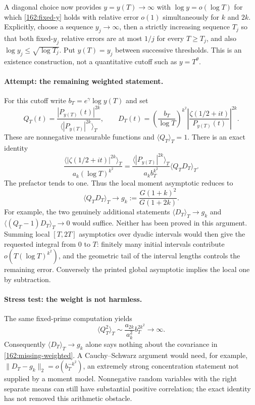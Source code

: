 \documentclass[11pt,a4paper]{article}
\numberwithin{equation}{section}
\begin{document}
A diagonal choice now provides $y=y(T)\to\infty$ with
$\log y=o(\log T)$ for which
\eqref{162:fixed-y} holds with relative error $o(1)$ simultaneously for
$k$ and $2k$. Explicitly, choose a sequence $y_j\to\infty$, then a
strictly increasing sequence $T_j$ so that both fixed-$y_j$ relative
errors are at most $1/j$ for every $T\ge T_j$, and also
$\log y_j\le\sqrt{\log T_j}$. Put $y(T)=y_j$ between successive thresholds.
This is an existence construction, not a quantitative cutoff such as
$y=T^\theta$.

\paragraph{Attempt: the remaining weighted statement.}
For this cutoff write $b_T=e^\gamma\log y(T)$ and set
\[
 Q_T(t)=\frac{|P_{y(T)}(t)|^{2k}}
                   {\langle|P_{y(T)}|^{2k}\rangle_T},\qquad
 D_T(t)=\left(\frac{b_T}{\log T}\right)^{k^2}
          \left|\frac{\zeta(1/2+it)}{P_{y(T)}(t)}\right|^{2k}.
\]
These are nonnegative measurable functions and $\langle Q_T\rangle_T=1$.
There is an exact identity
\begin{equation}\label{162:weighted-identity}
 \frac{\langle|\zeta(1/2+it)|^{2k}\rangle_T}
        {a_k(\log T)^{k^2}}
 =\frac{\langle|P_{y(T)}|^{2k}\rangle_T}{a_k b_T^{k^2}}
       \langle Q_TD_T\rangle_T.
\end{equation}
The prefactor tends to one. Thus the local moment asymptotic reduces to
\begin{equation}\label{162:missing-weighted}
 \langle Q_TD_T\rangle_T\longrightarrow
 g_k:=\frac{G(1+k)^2}{G(1+2k)}.
\end{equation}
For example, the two genuinely additional statements
$\langle D_T\rangle_T\to g_k$ and
$\langle(Q_T-1)D_T\rangle_T\to0$ would suffice. Neither has been proved
in this argument. Summing local $[T,2T]$ asymptotics over dyadic intervals
would then give the requested integral from $0$ to $T$: finitely many
initial intervals contribute $o(T(\log T)^{k^2})$, and the geometric tail
of the interval lengths controls the remaining error. Conversely the
printed global asymptotic implies the local one by subtraction.

\paragraph{Stress test: the weight is not harmless.}
The same fixed-prime computation yields
\begin{equation}\label{162:variance}
 \langle Q_T^2\rangle_T
 \sim\frac{a_{2k}}{a_k^2}b_T^{2k^2}\longrightarrow\infty.
\end{equation}
Consequently $\langle D_T\rangle_T\to g_k$ alone says nothing about the
covariance in \eqref{162:missing-weighted}. A Cauchy--Schwarz argument
would need, for example,
$\|D_T-g_k\|_2=o(b_T^{-k^2})$, an extremely strong concentration
statement not supplied by a moment model. Nonnegative random variables
with the right separate means can still have substantial positive
correlation; the exact identity has not removed this arithmetic obstacle.
\end{document}
